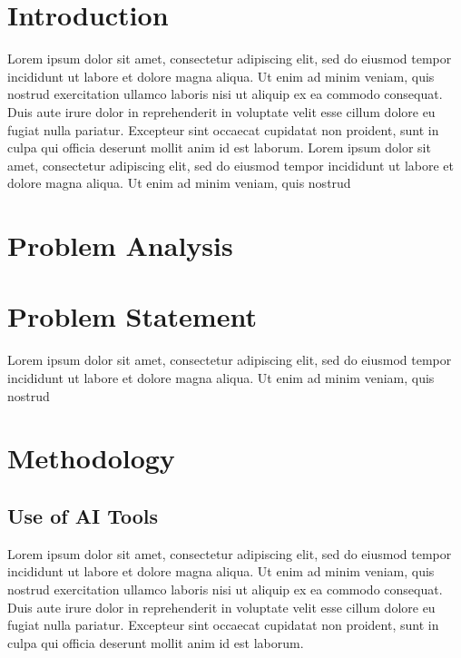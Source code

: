 \documentclass[12pt,a4paper]{article}
\begin{document}

\clearpage
\tableofcontents
\clearpage

\section{Introduction}
\label{introduktion}
Lorem ipsum dolor sit amet, consectetur adipiscing elit, sed do eiusmod tempor incididunt ut labore et dolore magna aliqua. Ut enim ad minim veniam, quis nostrud exercitation ullamco laboris nisi ut aliquip ex ea commodo consequat. Duis aute irure dolor in reprehenderit in voluptate velit esse cillum dolore eu fugiat nulla pariatur. Excepteur sint occaecat cupidatat non proident, sunt in culpa qui officia deserunt mollit anim id est laborum. Lorem ipsum dolor sit amet, consectetur adipiscing elit, sed do eiusmod tempor incididunt ut labore et dolore magna aliqua. Ut enim ad minim veniam, quis nostrud 
\clearpage
\section{Problem Analysis}
\label{Problemfield}

\clearpage
 
\section{Problem Statement}
\label{problem_statement}
Lorem ipsum dolor sit amet, consectetur adipiscing elit, sed do eiusmod tempor incididunt ut labore et dolore magna aliqua. Ut enim ad minim veniam, quis nostrud 

\section{Methodology}
\label{methodology}

\subsection{Use of AI Tools}
\label{use_of_ai_tools}
Lorem ipsum dolor sit amet, consectetur adipiscing elit, sed do eiusmod tempor incididunt ut labore et dolore magna aliqua. Ut enim ad minim veniam, quis nostrud exercitation ullamco laboris nisi ut aliquip ex ea commodo consequat. Duis aute irure dolor in reprehenderit in voluptate velit esse cillum dolore eu fugiat nulla pariatur. Excepteur sint occaecat cupidatat non proident, sunt in culpa qui officia deserunt mollit anim id est laborum.
\clearpage
\end{document}
